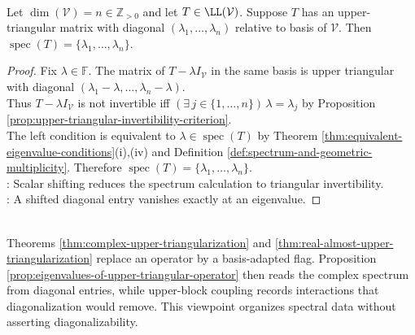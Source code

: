 \begin{proposition} \label{prop:eigenvalues-of-upper-triangular-operator} \\
Let $\dim(\mathcal{V})=n\in\mathbb{Z}_{>0}$ and let $T\in\LL(\mathcal{V})$. Suppose $T$ has an upper-triangular matrix with diagonal $(\lambda_1,\ldots,\lambda_n)$ relative to basis of $\mathcal{V}$. Then $\operatorname{spec}(T)=\{\lambda_1,\ldots,\lambda_n\}$.
\begin{proof}
Fix $\lambda\in\mathbb{F}$. The matrix of $T-\lambda I_{\mathcal{V}}$ in the same basis is upper triangular with diagonal $(\lambda_1-\lambda,\ldots,\lambda_n-\lambda)$.\\
Thus $T-\lambda I_{\mathcal{V}}$ is not invertible iff $(\exists\,j\in\{1,\ldots,n\})\,\lambda=\lambda_j$ by Proposition \ref{prop:upper-triangular-invertibility-criterion}.\\
The left condition is equivalent to $\lambda\in\operatorname{spec}(T)$ by Theorem \ref{thm:equivalent-eigenvalue-conditions}(i),(iv) and Definition \ref{def:spectrum-and-geometric-multiplicity}. Therefore $\operatorname{spec}(T)=\{\lambda_1,\ldots,\lambda_n\}$.\\
: Scalar shifting reduces the spectrum calculation to triangular invertibility.\\
: A shifted diagonal entry vanishes exactly at an eigenvalue.
\end{proof}
\end{proposition}

\begin{perspective} \label{per:upper-triangular-viewpoint} \\
Theorems \ref{thm:complex-upper-triangularization} and \ref{thm:real-almost-upper-triangularization} replace an operator by a basis-adapted flag. Proposition \ref{prop:eigenvalues-of-upper-triangular-operator} then reads the complex spectrum from diagonal entries, while upper-block coupling records interactions that diagonalization would remove. This viewpoint organizes spectral data without asserting diagonalizability.
\end{perspective}
